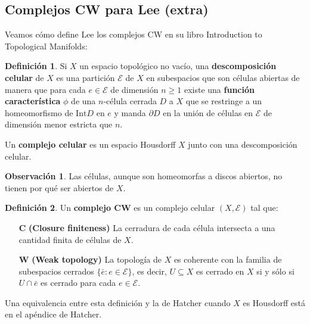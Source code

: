\documentclass[spanish]{book}
\theoremstyle{definition}
\newtheorem*{defn}{Definición}
\newtheorem*{obs}{Observación}
\begin{document}
\subsection{Complejos CW para Lee (extra)}
Veamos cómo define Lee los complejos CW en su libro Introduction to Topological Manifolds:
\begin{defn}
	Si $X$ un espacio topológico no vacío, una \textbf{descomposición celular} de $X$ es una partición $\mathcal{E}$ de $X$ en subespacios que son células abiertas de manera que para cada $e\in\mathcal{E}$ de dimensión $n\geq1$ existe una \textbf{función característica} $\phi$ de una $n$-célula cerrada $D$ a $X$ que se restringe a un homeomorfismo de $\text{Int}D$ en $e$ y manda $\partial D$ en la unión de células en $\mathcal{E}$ de dimensión menor estricta que $n$.
	
	Un \textbf{complejo celular} es un espacio Housdorff $X$ junto con una descomposición celular.
\end{defn}
\begin{obs}
	Las células, aunque son homeomorfas a discos abiertos, no tienen por qué ser abiertos de $X$.
\end{obs}
\begin{defn}
	Un \textbf{complejo CW} es un complejo celular $(X,\mathcal{E})$ tal que:
	\begin{enumerate}
		\item[\textbf{C}] \textbf{(Closure finiteness)} La cerradura de cada célula intersecta a una cantidad finita de células de $X$.
		\item[\textbf{W}] \textbf{(Weak topology)} La topología de $X$ es coherente con la familia de subespacios cerrados $\{\bar{e}:e\in\mathcal{E}\}$, es decir, $U\subseteq X$ es cerrado en $X$ si y sólo si $U\cap \bar{e}$ es cerrado para cada $e\in\mathcal{E}$.
	\end{enumerate}
	Una equivalencia entre esta definición y la de Hatcher cuando $X$ es Housdorff está en el apéndice de Hatcher.
\end{defn}
\end{document}
